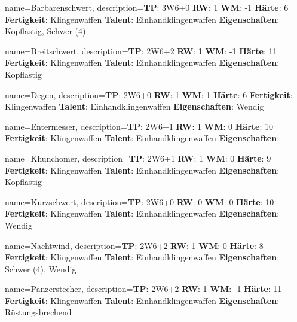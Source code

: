 {
    name={Barbarenschwert},
    description={\textbf{TP}: 3W6+0 \textbf{RW}: 1 \textbf{WM}: -1 \textbf{Härte}: 6        \textbf{Fertigkeit}: Klingenwaffen \textbf{Talent}: Einhandklingenwaffen \textbf{{Eigenschaften}}: Kopflastig, Schwer (4)}
}



{
    name={Breitschwert},
    description={\textbf{TP}: 2W6+2 \textbf{RW}: 1 \textbf{WM}: -1 \textbf{Härte}: 11        \textbf{Fertigkeit}: Klingenwaffen \textbf{Talent}: Einhandklingenwaffen \textbf{{Eigenschaften}}: Kopflastig}
}



{
    name={Degen},
    description={\textbf{TP}: 2W6+0 \textbf{RW}: 1 \textbf{WM}: 1 \textbf{Härte}: 6        \textbf{Fertigkeit}: Klingenwaffen \textbf{Talent}: Einhandklingenwaffen \textbf{{Eigenschaften}}: Wendig}
}



{
    name={Entermesser},
    description={\textbf{TP}: 2W6+1 \textbf{RW}: 1 \textbf{WM}: 0 \textbf{Härte}: 10        \textbf{Fertigkeit}: Klingenwaffen \textbf{Talent}: Einhandklingenwaffen \textbf{{Eigenschaften}}: }
}



{
    name={Khunchomer},
    description={\textbf{TP}: 2W6+1 \textbf{RW}: 1 \textbf{WM}: 0 \textbf{Härte}: 9        \textbf{Fertigkeit}: Klingenwaffen \textbf{Talent}: Einhandklingenwaffen \textbf{{Eigenschaften}}: Kopflastig}
}



{
    name={Kurzschwert},
    description={\textbf{TP}: 2W6+0 \textbf{RW}: 0 \textbf{WM}: 0 \textbf{Härte}: 10        \textbf{Fertigkeit}: Klingenwaffen \textbf{Talent}: Einhandklingenwaffen \textbf{{Eigenschaften}}: Wendig}
}



{
    name={Nachtwind},
    description={\textbf{TP}: 2W6+2 \textbf{RW}: 1 \textbf{WM}: 0 \textbf{Härte}: 8        \textbf{Fertigkeit}: Klingenwaffen \textbf{Talent}: Einhandklingenwaffen \textbf{{Eigenschaften}}: Schwer (4), Wendig}
}



{
    name={Panzerstecher},
    description={\textbf{TP}: 2W6+2 \textbf{RW}: 1 \textbf{WM}: -1 \textbf{Härte}: 11        \textbf{Fertigkeit}: Klingenwaffen \textbf{Talent}: Einhandklingenwaffen \textbf{{Eigenschaften}}: Rüstungsbrechend}
}



